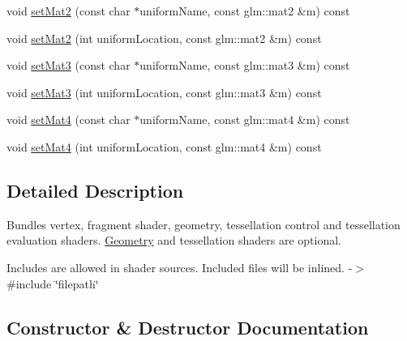 \textbf{ }\par
\begin{DoxyCompactItemize}
\item 
void \mbox{\hyperlink{classec_1_1_shader_a47782ae05dace705129f12b9feec03ce}{set\+Mat2}} (const char $\ast$uniform\+Name, const glm\+::mat2 \&m) const
\item 
void \mbox{\hyperlink{classec_1_1_shader_a6b2ee27e91d3f4f9465008df1aad4366}{set\+Mat2}} (int uniform\+Location, const glm\+::mat2 \&m) const
\end{DoxyCompactItemize}

\textbf{ }\par
\begin{DoxyCompactItemize}
\item 
void \mbox{\hyperlink{classec_1_1_shader_abb9b4a0e149edcba5ad255f2393b52bf}{set\+Mat3}} (const char $\ast$uniform\+Name, const glm\+::mat3 \&m) const
\item 
void \mbox{\hyperlink{classec_1_1_shader_a134b5b5da07fba23324b1035d3b246cb}{set\+Mat3}} (int uniform\+Location, const glm\+::mat3 \&m) const
\end{DoxyCompactItemize}

\textbf{ }\par
\begin{DoxyCompactItemize}
\item 
void \mbox{\hyperlink{classec_1_1_shader_a2aae545a7c6999a1e27d376e02be5fe4}{set\+Mat4}} (const char $\ast$uniform\+Name, const glm\+::mat4 \&m) const
\item 
void \mbox{\hyperlink{classec_1_1_shader_a70b14375c038b9814fe16b8e3ea92a13}{set\+Mat4}} (int uniform\+Location, const glm\+::mat4 \&m) const
\end{DoxyCompactItemize}



\subsection{Detailed Description}
Bundles vertex, fragment shader, geometry, tessellation control and tessellation evaluation shaders. \mbox{\hyperlink{classec_1_1_geometry}{Geometry}} and tessellation shaders are optional. 

Includes are allowed in shader sources. Included files will be inlined. -\/$>$ \#include \char`\"{}filepath\char`\"{} 

\subsection{Constructor \& Destructor Documentation}
\mbox{\label{classec_1_1_shader_a3a564a98ae49d2c050dc2221d56d54ca}} 
